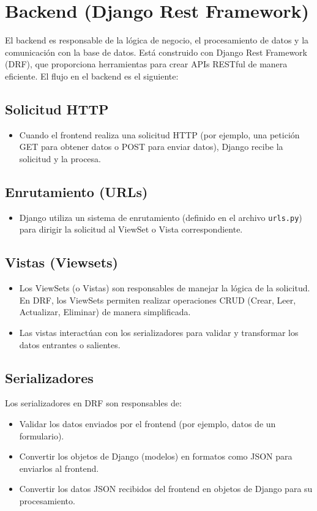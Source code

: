 \documentclass{report}
\begin{document}
    \section*{Backend (Django Rest Framework)}
    El backend es responsable de la lógica de negocio, el procesamiento de datos y la comunicación con la base de datos. Está construido con Django Rest Framework (DRF), que proporciona herramientas para crear APIs RESTful de manera eficiente. El flujo en el backend es el siguiente:
    
    \subsection*{Solicitud HTTP}
    \begin{itemize}
        \item Cuando el frontend realiza una solicitud HTTP (por ejemplo, una petición GET para obtener datos o POST para enviar datos), Django recibe la solicitud y la procesa.
    \end{itemize}
    
    \subsection*{Enrutamiento (URLs)}
    \begin{itemize}
        \item Django utiliza un sistema de enrutamiento (definido en el archivo \texttt{urls.py}) para dirigir la solicitud al ViewSet o Vista correspondiente.
    \end{itemize}
    
    \subsection*{Vistas (Viewsets)}
    \begin{itemize}
        \item Los ViewSets (o Vistas) son responsables de manejar la lógica de la solicitud. En DRF, los ViewSets permiten realizar operaciones CRUD (Crear, Leer, Actualizar, Eliminar) de manera simplificada.
        \item Las vistas interactúan con los serializadores para validar y transformar los datos entrantes o salientes.
    \end{itemize}
    
    \subsection*{Serializadores}
    Los serializadores en DRF son responsables de:
    \begin{itemize}
        \item Validar los datos enviados por el frontend (por ejemplo, datos de un formulario).
        \item Convertir los objetos de Django (modelos) en formatos como JSON para enviarlos al frontend.
        \item Convertir los datos JSON recibidos del frontend en objetos de Django para su procesamiento.
    \end{itemize}
    
\end{document}
